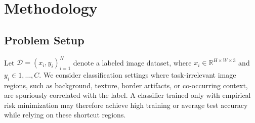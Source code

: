 

\section{Methodology}
\label{sec:method}

\subsection{Problem Setup}
Let $\mathcal{D}={(x_i,y_i)}_{i=1}^{N}$ denote a labeled image dataset, where $x_i\in\mathbb{R}^{H\times W\times 3}$ and $y_i\in{1,\ldots,C}$. We consider classification settings where task-irrelevant image regions, such as background, texture, border artifacts, or co-occurring context, are spuriously correlated with the label. A classifier trained only with empirical risk minimization may therefore achieve high training or average test accuracy while relying on these shortcut regions.


